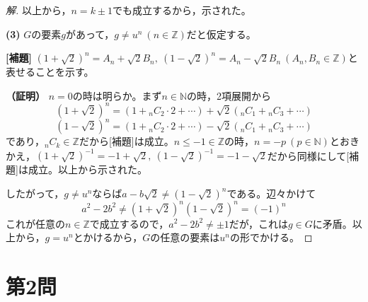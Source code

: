 \documentclass[../main.tex]{subfiles}
\begin{document}
\begin{proof}[解]
  以上から，$n=k\pm1$でも成立するから，示された。

  \textbf{(3)} $G$の要素$g$があって，$g\ne u^n\ (n\in\mathbb{Z})$だと仮定する。

  \textbf{[補題]} $(1+\sqrt2)^n=A_n+\sqrt2B_n,\ (1-\sqrt2)^n=A_n-\sqrt2B_n\ (A_n,B_n\in\mathbb{Z})$と表せることを示す。

  \textbf{（証明）} $n=0$の時は明らか。まず$n\in\mathbb{N}$の時，2項展開から
  \[
    (1+\sqrt2)^n=(1+{}_nC_2\cdot2+\cdots)+\sqrt2({}_nC_1+{}_nC_3+\cdots)
  \]
  \[
    (1-\sqrt2)^n=(1+{}_nC_2\cdot2+\cdots)-\sqrt2({}_nC_1+{}_nC_3+\cdots)
  \]
  であり，${}_nC_k\in\mathbb{Z}$だから[補題]は成立。$n\le-1\in\mathbb{Z}$の時，$n=-p\ (p\in\mathbb{N})$とおきかえ，$(1+\sqrt2)^{-1}=-1+\sqrt2,\ (1-\sqrt2)^{-1}=-1-\sqrt2$だから同様にして[補題]は成立。以上から示された。

  したがって，$g\ne u^n$ならば$a-b\sqrt2\ne(1-\sqrt2)^n$である。辺々かけて
  \[
    a^2-2b^2\ne(1+\sqrt2)^n(1-\sqrt2)^n=(-1)^n
  \]
  これが任意の$n\in\mathbb{Z}$で成立するので，$a^2-2b^2\ne\pm1$だが，これは$g\in G$に矛盾。以上から，$g=u^n$とかけるから，$G$の任意の要素は$u^n$の形でかける。
\end{proof}

\newpage

\section*{第2問}
\end{document}

